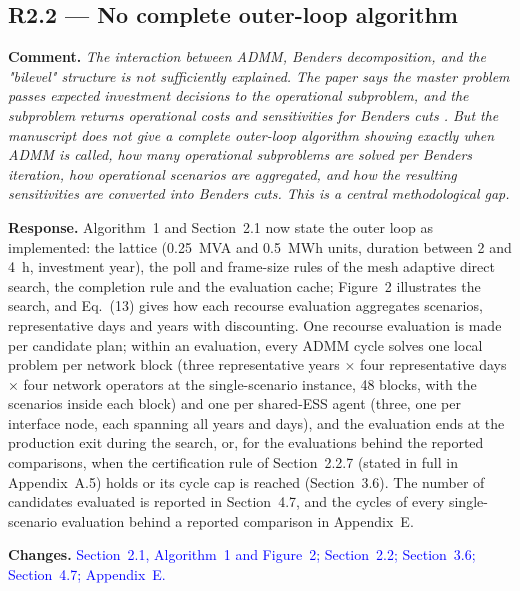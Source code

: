 \documentclass[11pt]{article}
\newcommand{\rcomment}[1]{\par\medskip\noindent\textbf{Comment.} \textit{#1}\par\smallskip}
\newcommand{\rresponse}[1]{\noindent\textbf{Response.} #1\par\smallskip}
\newcommand{\rchanges}[1]{\noindent\textbf{Changes.} \textcolor{blue}{#1}\par\medskip}
\begin{document}
\subsection*{R2.2 --- No complete outer-loop algorithm}
\rcomment{The interaction between ADMM, Benders decomposition, and the "bilevel" structure is not sufficiently explained. The paper says the master problem passes expected investment decisions to the operational subproblem, and the subproblem returns operational costs and sensitivities for Benders cuts . But the manuscript does not give a complete outer-loop algorithm showing exactly when ADMM is called, how many operational subproblems are solved per Benders iteration, how operational scenarios are aggregated, and how the resulting sensitivities are converted into Benders cuts. This is a central methodological gap.}
\rresponse{Algorithm~1 and Section~2.1 now state the outer loop as implemented: the lattice (0.25~MVA and 0.5~MWh units, duration between 2 and 4~h, investment year), the poll and frame-size rules of the mesh adaptive direct search, the completion rule and the evaluation cache; Figure~2 illustrates the search, and Eq.~(13) gives how each recourse evaluation aggregates scenarios, representative days and years with discounting. One recourse evaluation is made per candidate plan; within an evaluation, every ADMM cycle solves one local problem per network block (three representative years $\times$ four representative days $\times$ four network operators at the single-scenario instance, 48 blocks, with the scenarios inside each block) and one per shared-ESS agent (three, one per interface node, each spanning all years and days), and the evaluation ends at the production exit during the search, or, for the evaluations behind the reported comparisons, when the certification rule of Section~2.2.7 (stated in full in Appendix~A.5) holds or its cycle cap is reached (Section~3.6). The number of candidates evaluated is reported in Section~4.7, and the cycles of every single-scenario evaluation behind a reported comparison in Appendix~E.}
\rchanges{Section~2.1, Algorithm~1 and Figure~2; Section~2.2; Section~3.6; Section~4.7; Appendix~E.}
\end{document}
